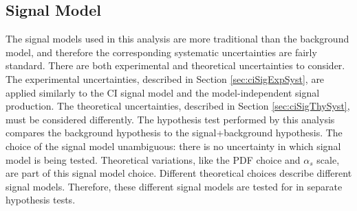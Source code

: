 

\subsection{Signal Model}\label{sec:ciSystSig}
The signal models used in this analysis are more traditional than the background model, and therefore the corresponding systematic uncertainties are fairly standard.
There are both experimental and theoretical uncertainties to consider.
The experimental uncertainties, described in Section \ref{sec:ciSigExpSyst}, are applied similarly to the CI signal model and the model-independent signal production.
The theoretical uncertainties, described in Section \ref{sec:ciSigThySyst}, must be considered differently.
The hypothesis test performed by this analysis compares the background hypothesis to the signal+background hypothesis.
The choice of the signal model unambiguous: there is no uncertainty in which signal model is being tested.
Theoretical variations, like the PDF choice and $\alpha_s$ scale, are part of this signal model choice.
Different theoretical choices describe different signal models.
Therefore, these different signal models are tested for in separate hypothesis tests.


